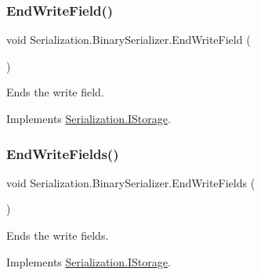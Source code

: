 \subsubsection{\texorpdfstring{End\+Write\+Field()}{EndWriteField()}}
{\footnotesize\ttfamily void Serialization.\+Binary\+Serializer.\+End\+Write\+Field (\begin{DoxyParamCaption}{ }\end{DoxyParamCaption})\hspace{0.3cm}{\ttfamily [inline]}}



Ends the write field. 



Implements \hyperlink{interface_serialization_1_1_i_storage_a0e0c8f96ea2316bc9efc73cd27176897}{Serialization.\+I\+Storage}.

\mbox{\label{class_serialization_1_1_binary_serializer_a09fa1076cad8e42856d57a62d693c4cf}} 
\subsubsection{\texorpdfstring{End\+Write\+Fields()}{EndWriteFields()}}
{\footnotesize\ttfamily void Serialization.\+Binary\+Serializer.\+End\+Write\+Fields (\begin{DoxyParamCaption}{ }\end{DoxyParamCaption})\hspace{0.3cm}{\ttfamily [inline]}}



Ends the write fields. 



Implements \hyperlink{interface_serialization_1_1_i_storage_a8584d495d876a2b05ba671de46e33006}{Serialization.\+I\+Storage}.

\mbox{\label{class_serialization_1_1_binary_serializer_a71b4595291913c4cdc62b860da2ffa7c}} 
